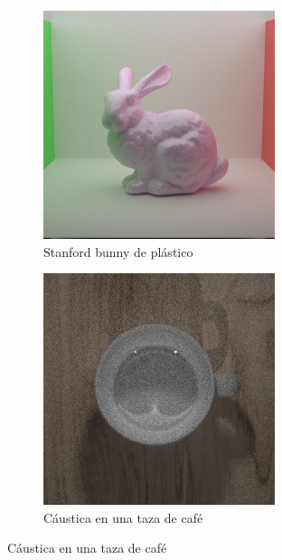 \documentclass{article}
\begin{document}
\begin{figure}[H]
\begin{subfigure}[h]{0.4\linewidth}
\includegraphics[width=\linewidth]{imgs/plastic_bunny.png}
\caption{Stanford bunny de plástico}
\end{subfigure}
\hfill
\begin{subfigure}[h]{0.4\linewidth}
\includegraphics[width=\linewidth]{imgs/nephroid.png}
\caption{Cáustica en una taza de café}
\end{subfigure}


\end{figure}
\end{document}
